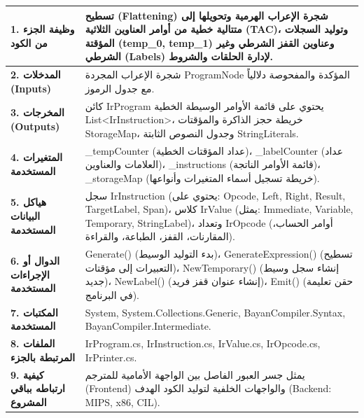 \documentclass[12pt,a4paper]{report}
\begin{document}
\begin{tcolorbox}[colback=white,colframe=vscodeBlue!80!black,arc=2mm,title=\textbf{بطاقة المواصفات البرمجية للشفرة الوسيطة (Three-Address Code Specification)}]
\begin{tabularx}{\linewidth}{p{4.2cm} X}
    \textbf{1. وظيفة الجزء من الكود} & تسطيح (Flattening) شجرة الإعراب الهرمية وتحويلها إلى متتالية خطية من أوامر العناوين الثلاثية (TAC)، وتوليد السجلات المؤقتة (temp\_0, temp\_1) وعناوين القفز الشرطي وغير الشرطي (Labels) لإدارة الحلقات والشروط. \\
    \midrule
    \textbf{2. المدخلات (Inputs)} & شجرة الإعراب المجردة \textenglish{ProgramNode} المؤكدة والمفحوصة دلالياً مع جدول الرموز. \\
    \midrule
    \textbf{3. المخرجات (Outputs)} & كائن \textenglish{IrProgram} يحتوي على قائمة الأوامر الوسيطة الخطية \textenglish{List\textless IrInstruction\textgreater}، خريطة حجز الذاكرة والمؤقتات \textenglish{StorageMap}، وجدول النصوص الثابتة \textenglish{StringLiterals}. \\
    \midrule
    \textbf{4. المتغيرات المستخدمة} & \textenglish{\_tempCounter} (عداد المؤقتات الخطية)، \textenglish{\_labelCounter} (عداد العلامات والعناوين)، \textenglish{\_instructions} (قائمة الأوامر الناتجة)، \textenglish{\_storageMap} (خريطة تسجيل أسماء المتغيرات وأنواعها). \\
    \midrule
    \textbf{5. هياكل البيانات المستخدمة} & سجل \textenglish{IrInstruction} (يحتوي على: Opcode, Left, Right, Result, TargetLabel, Span)، كلاس \textenglish{IrValue} (يمثل: Immediate, Variable, Temporary, StringLabel)، وتعداد \textenglish{IrOpcode} (أوامر الحساب، المقارنات، القفز، الطباعة، والقراءة). \\
    \midrule
    \textbf{6. الدوال أو الإجراءات المستخدمة} & \textenglish{Generate()} (بدء التوليد الوسيط)، \textenglish{GenerateExpression()} (تسطيح التعبيرات إلى مؤقتات)، \textenglish{NewTemporary()} (إنشاء سجل وسيط جديد)، \textenglish{NewLabel()} (إنشاء عنوان قفز فريد)، \textenglish{Emit()} (حقن تعليمة في البرنامج). \\
    \midrule
    \textbf{7. المكتبات المستخدمة} & \textenglish{System, System.Collections.Generic, BayanCompiler.Syntax, BayanCompiler.Intermediate}. \\
    \midrule
    \textbf{8. الملفات المرتبطة بالجزء} & \textenglish{IrProgram.cs, IrInstruction.cs, IrValue.cs, IrOpcode.cs, IrPrinter.cs}. \\
    \midrule
    \textbf{9. كيفية ارتباطه بباقي المشروع} & يمثل جسر العبور الفاصل بين الواجهة الأمامية للمترجم (Frontend) والواجهات الخلفية لتوليد الكود الهدف (Backend: MIPS, x86, CIL). \\
\end{tabularx}
\end{tcolorbox}
\end{document}
